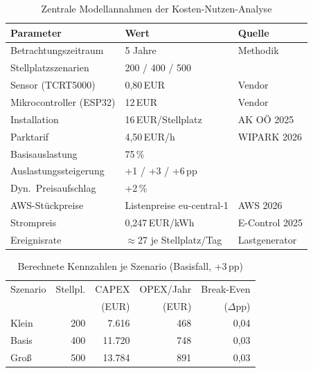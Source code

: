 \begin{table}[!ht]
  \centering
  \caption{Zentrale Modellannahmen der Kosten-Nutzen-Analyse}
  \label{tab:assumptions}
  \begin{tabular}{lll}
    \toprule
    Parameter & Wert & Quelle \\
    \midrule
    Betrachtungszeitraum & 5 Jahre & Methodik \\
    Stellplatzszenarien & 200 / 400 / 500 & \citep{stadtwienParkleitsystemFuerWien2026} \\
    Sensor (TCRT5000) & 0{,}80\,EUR & Vendor \\
    Mikrocontroller (ESP32) & 12\,EUR & Vendor \\
    Installation & 16\,EUR/Stellplatz & AK OÖ 2025 \\
    Parktarif & 4{,}50\,EUR/h & WIPARK 2026 \\
    Basisauslastung & 75\,\% & \citep{wangEconomicsSmartParking2025} \\
    Auslastungssteigerung & +1 / +3 / +6\,pp & \citep{wangEconomicsSmartParking2025,sarkerSmartParkingSystem2020} \\
    Dyn.\ Preisaufschlag & +2\,\% & \citep{hassineDynamicPricingRoute2024} \\
    AWS-Stückpreise & Listenpreise eu-central-1 & AWS 2026 \\
    Strompreis & 0{,}247\,EUR/kWh & E-Control 2025 \\
    Ereignisrate & $\approx$27 je Stellplatz/Tag & Lastgenerator \\
    \bottomrule
  \end{tabular}
\end{table}

\begin{table}[!ht]
  \centering
  \caption{Berechnete Kennzahlen je Szenario (Basisfall, +3\,pp)}
  \label{tab:results}
  \begin{tabular}{lrrrr}
    \toprule
    Szenario & Stellpl. & CAPEX & OPEX/Jahr & Break-Even \\
             &          & (EUR)  & (EUR)     & ($\Delta$pp) \\
    \midrule
    Klein & 200 & 7.616  & 468 & 0{,}04 \\
    Basis & 400 & 11.720 & 748 & 0{,}03 \\
    Groß  & 500 & 13.784 & 891 & 0{,}03 \\
    \bottomrule
  \end{tabular}
\end{table}

